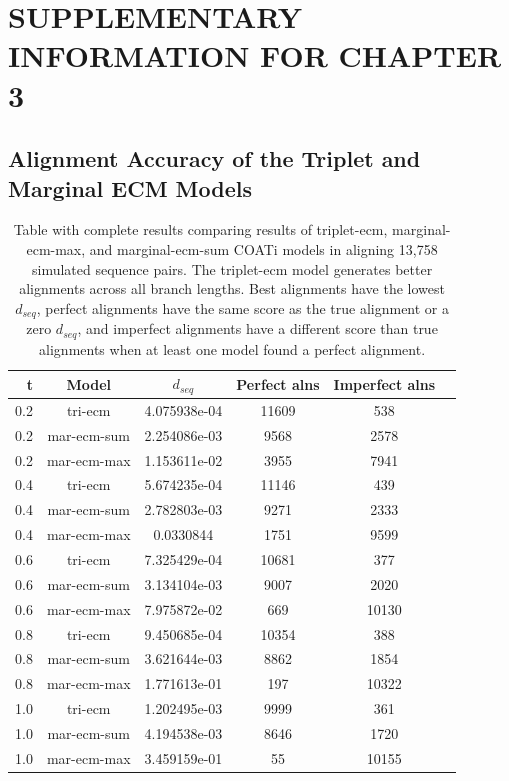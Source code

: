 \chapter{SUPPLEMENTARY INFORMATION FOR CHAPTER 3} \label{ch:ch3-supplement}

\clearpage

\section*{Alignment Accuracy of the Triplet and Marginal ECM Models}

\begin{table}[!ht]
\centering

\begingroup\centering
\begin{tabular}{r|ccccc}
      \textbf{t} & \textbf{Model} & \textbf{$d_{seq}$} & \textbf{Perfect alns} & \textbf{Imperfect alns}\\
\hline
\hline
0.2 & tri-ecm & 4.075938e-04 & 11609 & 538\\
0.2 & mar-ecm-sum & 2.254086e-03 & 9568 & 2578\\
0.2 & mar-ecm-max & 1.153611e-02 & 3955 & 7941\\
\hline
0.4 & tri-ecm & 5.674235e-04 & 11146 & 439\\
0.4 & mar-ecm-sum & 2.782803e-03 & 9271 & 2333\\
0.4 & mar-ecm-max & 0.0330844 & 1751 & 9599\\
\hline
0.6 & tri-ecm & 7.325429e-04 & 10681 & 377\\
0.6 & mar-ecm-sum & 3.134104e-03 & 9007 & 2020\\
0.6 & mar-ecm-max & 7.975872e-02 & 669 & 10130\\
\hline
0.8 & tri-ecm & 9.450685e-04 & 10354 & 388\\
0.8 & mar-ecm-sum & 3.621644e-03 & 8862 & 1854\\
0.8 & mar-ecm-max & 1.771613e-01 & 197 & 10322\\
\hline
1.0 & tri-ecm & 1.202495e-03 & 9999 & 361\\
1.0 & mar-ecm-sum & 4.194538e-03 & 8646 & 1720\\
1.0 & mar-ecm-max & 3.459159e-01 & 55 & 10155\\
\end{tabular}
\par\endgroup
 \caption[Alignment Accuracy of the Triplet and Marginal ECM Models]{Table with complete results comparing results of triplet-ecm, marginal-ecm-max, and marginal-ecm-sum COATi models in aligning 13,758 simulated sequence pairs. The triplet-ecm model generates better alignments across all branch lengths. Best alignments have the lowest $d_{seq}$, perfect alignments have the same score as the true alignment or a zero $d_{seq}$, and imperfect alignments have a different score than true alignments when at least one model found a perfect alignment.}
 \label{table:results-ecm}
\end{table}

